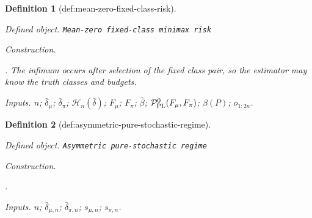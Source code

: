 \documentclass{article}
\newtheorem{definition}{Definition}
\begin{document}
\begin{definition}[def:mean-zero-fixed-class-risk]\label{def:mean-zero-fixed-class-risk}
\par\smallskip\noindent\emph{Defined object.} \texttt{Mean-\allowbreak{}zero fixed-\allowbreak{}class minimax risk}
\par\smallskip\noindent\emph{Construction.} \par\noindent {}\par\noindent. The infimum occurs after selection of the fixed class pair, so the estimator may know the truth classes and budgets.
\par\smallskip\noindent\emph{Inputs.} \(n\); \(\bar\delta_\mu\); \(\bar\delta_\pi\); \(\mathcal H_n(\bar\delta)\); \(F_\mu\); \(F_\pi\); \(\widehat\beta\); \(\mathcal P_{\rm PL}^{0}(F_\mu,F_\pi)\); \(\beta(P)\); \(o_{1:2n}\).
\end{definition}

\begin{definition}[def:asymmetric-pure-stochastic-regime]\label{def:asymmetric-pure-stochastic-regime}
\par\smallskip\noindent\emph{Defined object.} \texttt{Asymmetric pure-\allowbreak{}stochastic regime}
\par\smallskip\noindent\emph{Construction.} \par\noindent {}\par\noindent.
\par\smallskip\noindent\emph{Inputs.} \(n\); \(\bar\delta_{\mu,n}\); \(\bar\delta_{\pi,n}\); \(s_{\mu,n}\); \(s_{\pi,n}\).
\end{definition}
\end{document}
